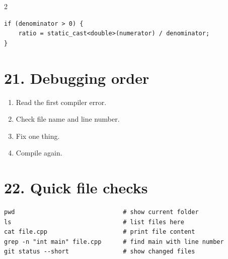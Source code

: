 \documentclass[10pt]{article}
\begin{document}
\begin{multicols}{2}
\begin{lstlisting}[style=cppstyle]
if (denominator > 0) {
    ratio = static_cast<double>(numerator) / denominator;
}
\end{lstlisting}

\section{21. Debugging order}
\begin{enumerate}
    \item Read the first compiler error.
    \item Check file name and line number.
    \item Fix one thing.
    \item Compile again.
\end{enumerate}

\section{22. Quick file checks}
\begin{lstlisting}[style=bashstyle]
pwd                              # show current folder
ls                               # list files here
cat file.cpp                     # print file content
grep -n "int main" file.cpp      # find main with line number
git status --short               # show changed files
\end{lstlisting}

\end{multicols}
\end{document}
